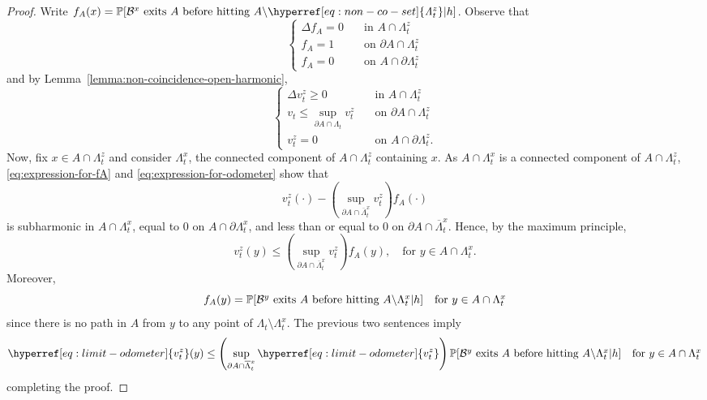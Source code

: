 \documentclass[12pt]{amsart}
\numberwithin{equation}{section}
\newcommand{\cluster}[2]{\hyperref[eq:non-co-set]{\mathit{\Lambda}^{#1}_{#2}}}
\newcommand{\odometer}[2]{\hyperref[eq:limit-odometer]{v^{#1}_{#2}}}
\begin{document}
	\begin{proof}
		Write $f_A(x) =\P[\mbox{$\mathcal{B}^x$ exits  $A$ before hitting  $A \backslash {\cluster{z}{t}}$} | h]$. Observe that
		\begin{equation} \label{eq:expression-for-fA}
		\begin{cases}
		\Delta f_A = 0 \quad &\mbox{in $A \cap {\cluster{z}{t}}$} \\
		f_A = 1 \quad &\mbox{on $\partial A \cap {\cluster{z}{t}}$} \\
		f_A = 0 \quad &\mbox{on $A \cap \partial {\cluster{z}{t}}$}
		\end{cases}
		\end{equation}
		and by Lemma~\ref{lemma:non-coincidence-open-harmonic},
		\begin{equation}\label{eq:expression-for-odometer}
		\begin{cases}
		\Delta \odometer{z}{t} \geq 0 \quad &\mbox{in $A \cap {\cluster{z}{t}}$} \\
		\odometer{}{t} \leq \sup_{\partial A \cap {\cluster{}{t}}} \odometer{z}{t} \quad &\mbox{on $\partial A \cap {\cluster{z}{t}}$} \\
		\odometer{z}{t} = 0 \quad &\mbox{on $A \cap \partial {\cluster{z}{t}}$}.
		\end{cases}
		\end{equation}
		Now, fix $x \in A \cap {\cluster{z}{t}}$ and consider $\Lambda^x_t$, the connected component of $A \cap {\cluster{z}{t}}$ containing $x$.  
		As $A \cap \Lambda^x_t$ is a connected component of $A \cap {\cluster{z}{t}}$, \eqref{eq:expression-for-fA} and \eqref{eq:expression-for-odometer}
		show that 
		\[
		\odometer{z}{t}(\cdot) - \left(\sup_{\partial A \cap \overline \Lambda^x_t} \odometer{z}{t}\right) f_A(\cdot)
		\]
		is subharmonic in $A \cap \Lambda^x_t$, equal to 0 on $A \cap \partial \Lambda^x_t$, and less than or 
		equal to 0 on $\partial A \cap \overline \Lambda^x_t$. 
		Hence, by the maximum principle,
		\[
		\odometer{z}{t}(y) \leq  \left(\sup_{\partial A \cap \overline \Lambda^x_t} \odometer{z}{t}\right) f_A(y) , \quad \mbox{for $y \in A \cap \Lambda^x_t$} .
		\]
		Moreover, 
		\[
		f_A(y) = \P[\mbox{$\mathcal{B}^y$ exits  $A$ before hitting  $A \backslash \Lambda^x_t$} | h ] \quad \mbox{for $y \in A \cap \Lambda^x_t$}
		\]
		since there is no path in $A$ from $y$ to any point of $\Lambda_t\setminus \Lambda_t^x$.
		The previous two sentences imply  
		\[
		\odometer{z}{t}(y) \leq  \left(\sup_{\partial A \cap \overline \Lambda^x_t} \odometer{z}{t}\right) \P[\mbox{$\mathcal{B}^y$ exits  $A$ before hitting  $A \backslash \Lambda^x_t$} |h ]  \quad  \mbox{for $y \in A \cap \Lambda^x_t$}
		\]
		completing the proof. 	
	\end{proof}
	
\end{document}
